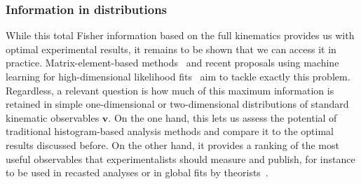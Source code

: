 \subsubsection{Information in distributions}

While this total Fisher information based on the full kinematics
provides us with optimal experimental results, it remains to be shown
that we can access it in practice. Matrix-element-based
methods~\cite{Kondo:1988yd, Abazov:2004cs, Gao:2010qx, Alwall:2010cq,
  Avery:2012um, Andersen:2012kn, Campbell:2013hz, Artoisenet:2013vfa,
  Martini:2015fsa, Gritsan:2016hjl, Soper:2011cr, Soper:2012pb,
  Soper:2014rya, Atwood:1991ka, Davier:1992nw, Diehl:1993br} and
recent proposals using machine learning for high-dimensional
likelihood fits~\cite{Cranmer:2015bka, Cranmer:2016lzt} aim to tackle
exactly this problem.  Regardless, a relevant question is how much of
this maximum information is retained in simple one-dimensional or
two-dimensional distributions of standard kinematic observables
$\mathbf{v}$. On the one hand, this lets us assess the potential of
traditional histogram-based analysis methods and compare it to the
optimal results discussed before. On the other hand, it provides a
ranking of the most useful observables that experimentalists should
measure and publish, for instance to be used in recasted analyses or
in global fits by theorists~\cite{Corbett:2015ksa, Butter:2016cvz}.

